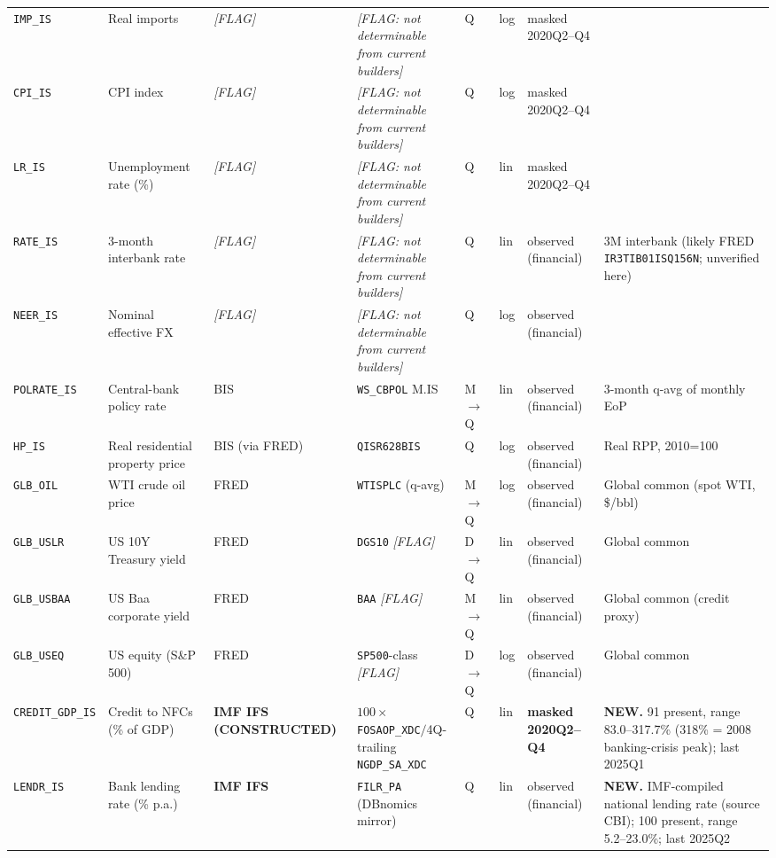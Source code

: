{\begin{longtable}{@{}p{2.0cm}p{2.7cm}p{1.4cm}p{2.8cm}p{0.7cm}p{0.85cm}p{1.5cm}p{2.3cm}@{}}
\texttt{IMP\_IS}    & Real imports                  & \textit{[FLAG]} & \textit{[FLAG: not determinable from current builders]} & Q & log & masked 2020Q2--Q4 & \\
\texttt{CPI\_IS}    & CPI index                     & \textit{[FLAG]} & \textit{[FLAG: not determinable from current builders]} & Q & log & masked 2020Q2--Q4 & \\
\texttt{LR\_IS}     & Unemployment rate (\%)        & \textit{[FLAG]} & \textit{[FLAG: not determinable from current builders]} & Q & lin & masked 2020Q2--Q4 & \\
\texttt{RATE\_IS}   & 3-month interbank rate        & \textit{[FLAG]} & \textit{[FLAG: not determinable from current builders]} & Q & lin & observed (financial) & 3M interbank (likely FRED \texttt{IR3TIB01ISQ156N}; unverified here) \\
\texttt{NEER\_IS}   & Nominal effective FX          & \textit{[FLAG]} & \textit{[FLAG: not determinable from current builders]} & Q & log & observed (financial) & \\
\texttt{POLRATE\_IS}& Central-bank policy rate      & BIS & \texttt{WS\_CBPOL} M.IS                                 & M$\to$Q & lin & observed (financial) & 3-month q-avg of monthly EoP \\
\texttt{HP\_IS}     & Real residential property price & BIS (via FRED) & \texttt{QISR628BIS}                          & Q & log & observed (financial) & Real RPP, 2010=100 \\
\texttt{GLB\_OIL}   & WTI crude oil price           & FRED & \texttt{WTISPLC} (q-avg)                               & M$\to$Q & log & observed (financial) & Global common (spot WTI, \$/bbl) \\
\texttt{GLB\_USLR}  & US 10Y Treasury yield         & FRED & \texttt{DGS10} \textit{[FLAG]}                          & D$\to$Q & lin & observed (financial) & Global common \\
\texttt{GLB\_USBAA} & US Baa corporate yield        & FRED & \texttt{BAA} \textit{[FLAG]}                            & M$\to$Q & lin & observed (financial) & Global common (credit proxy) \\
\texttt{GLB\_USEQ}  & US equity (S\&P 500)          & FRED & \texttt{SP500}-class \textit{[FLAG]}                    & D$\to$Q & log & observed (financial) & Global common \\
\texttt{CREDIT\_GDP\_IS} & Credit to NFCs (\% of GDP) & \textbf{IMF IFS (CONSTRUCTED)} & $100\times$\texttt{FOSAOP\_XDC}$/$4Q-trailing \texttt{NGDP\_SA\_XDC} & Q & lin & \textbf{masked 2020Q2--Q4} & \textbf{NEW.} 91 present, range 83.0--317.7\% (318\% = 2008 banking-crisis peak); last 2025Q1 \\
\texttt{LENDR\_IS}  & Bank lending rate (\% p.a.)   & \textbf{IMF IFS} & \texttt{FILR\_PA} (DBnomics mirror)                    & Q & lin & observed (financial) & \textbf{NEW.} IMF-compiled national lending rate (source CBI); 100 present, range 5.2--23.0\%; last 2025Q2 \\
\end{longtable}}

